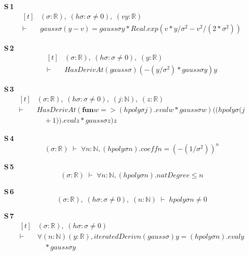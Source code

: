 \noindent\textbf{S\,1}\quad{}
{\footnotesize\[ \begin{aligned}[t]
&(\sigma : \mathbb{R} ),\; (\mathit{hσ} : \sigma \neq 0),\; (\mathit{v} \mathit{y} : \mathbb{R} )\\
\vdash\;&\mathit{gauss} \sigma (\mathit{y} - \mathit{v}) = \mathit{gauss} \sigma \mathit{y} * \mathit{Real}.\mathit{exp} (\mathit{v} * \mathit{y} / \sigma ^{2} - \mathit{v} ^{2} / (2 * \sigma ^{2}))
\end{aligned} \]}

\noindent\textbf{S\,2}\quad{}
{\footnotesize\[ \begin{aligned}[t]
&(\sigma : \mathbb{R} ),\; (\mathit{hσ} : \sigma \neq 0),\; (\mathit{y} : \mathbb{R} )\\
\vdash\;&\mathit{HasDerivAt} (\mathit{gauss} \sigma ) (-(\mathit{y} / \sigma ^{2}) * \mathit{gauss} \sigma \mathit{y}) \mathit{y}
\end{aligned} \]}

\noindent\textbf{S\,3}\quad{}
{\footnotesize\[ \begin{aligned}[t]
&(\sigma : \mathbb{R} ),\; (\mathit{hσ} : \sigma \neq 0),\; (\mathit{j} : \mathbb{N} ),\; (\mathit{z} : \mathbb{R} )\\
\vdash\;&\mathit{HasDerivAt} (\mathbf{fun} \mathit{w} => (\mathit{hpoly} \sigma \mathit{j}).\mathit{eval} \mathit{w} * \mathit{gauss} \sigma \mathit{w}) ((\mathit{hpoly} \sigma (\mathit{j}\\
&\quad + 1)).\mathit{eval} \mathit{z} * \mathit{gauss} \sigma \mathit{z}) \mathit{z}
\end{aligned} \]}

\noindent\textbf{S\,4}\quad{}
{\footnotesize\[ (\sigma : \mathbb{R} ) \;\vdash\; \forall \mathit{n} : \mathbb{N} , (\mathit{hpoly} \sigma \mathit{n}).\mathit{coeff} \mathit{n} = (-(1 / \sigma ^{2})) ^{\mathit{n}} \]}

\noindent\textbf{S\,5}\quad{}
{\footnotesize\[ (\sigma : \mathbb{R} ) \;\vdash\; \forall \mathit{n} : \mathbb{N} , (\mathit{hpoly} \sigma \mathit{n}).\mathit{natDegree} \leq \mathit{n} \]}

\noindent\textbf{S\,6}\quad{}
{\footnotesize\[ (\sigma : \mathbb{R} ),\; (\mathit{hσ} : \sigma \neq 0),\; (\mathit{n} : \mathbb{N} ) \;\vdash\; \mathit{hpoly} \sigma \mathit{n} \neq 0 \]}

\noindent\textbf{S\,7}\quad{}
{\footnotesize\[ \begin{aligned}[t]
&(\sigma : \mathbb{R} ),\; (\mathit{hσ} : \sigma \neq 0)\\
\vdash\;&\forall (\mathit{n} : \mathbb{N} ) (\mathit{y} : \mathbb{R} ), \mathit{iteratedDeriv} \mathit{n} (\mathit{gauss} \sigma ) \mathit{y} = (\mathit{hpoly} \sigma \mathit{n}).\mathit{eval} \mathit{y}\\
&\quad * \mathit{gauss} \sigma \mathit{y}
\end{aligned} \]}

